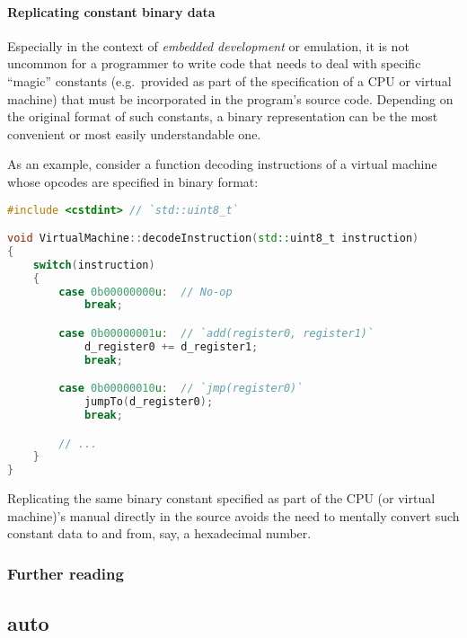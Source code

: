 \documentclass[twoside,10pt,letterpaper,usenames]{newstyle-PearsonGeneric-7-38}
\begin{document}
\paragraph[Replicating constant binary data]{Replicating constant binary data}\label{replicating-constant-binary-data}

Especially in the context of \emph{embedded development} or emulation,
it is not uncommon for a programmer to write code that needs to deal
with specific ``magic'' constants (e.g.~provided as part of the
specification of a CPU or virtual machine) that must be incorporated in
the program's source code. Depending on the original format of such
constants, a binary representation can be the most convenient or most
easily understandable one.

As an example, consider a function decoding instructions of a virtual
machine whose opcodes are specified in binary format:

\begin{lstlisting}[language=C++, caption={missing caption}, label={testlabel}, frame=tb]
#include <cstdint> // `std::uint8_t`

void VirtualMachine::decodeInstruction(std::uint8_t instruction)
{
    switch(instruction)
    {
        case 0b00000000u:  // No-op
            break;

        case 0b00000001u:  // `add(register0, register1)`
            d_register0 += d_register1;
            break;

        case 0b00000010u:  // `jmp(register0)`
            jumpTo(d_register0);
            break;

        // ...
    }
}
\end{lstlisting}
    

Replicating the same binary constant specified as part of the CPU (or
virtual machine)'s manual directly in the source avoids the need to
mentally convert such constant data to and from, say, a hexadecimal
number.

\subsubsection[Further reading]{Further reading}\label{further-reading}

\newpage

\subsection[\tt{auto}]{{\SubsecCode auto}}\label{auto}
\end{document}
